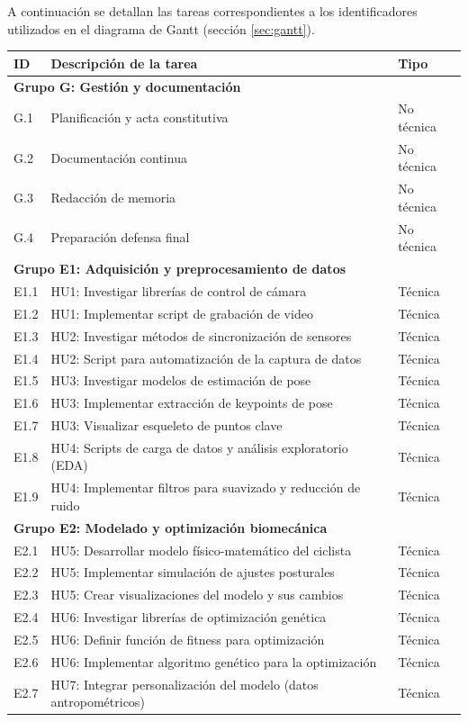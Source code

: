 \documentclass[
11pt, %
]{charter}
\begin{document}
A continuación se detallan las tareas correspondientes a los identificadores utilizados en el diagrama de Gantt (sección \ref{sec:gantt}).

\begin{longtable}{lp{10cm}l}
\toprule
\textbf{ID} & \textbf{Descripción de la tarea} & \textbf{Tipo} \\
\midrule
\endhead %

\multicolumn{3}{l}{\textbf{Grupo G: Gestión y documentación}} \\
G.1 & Planificación y acta constitutiva & No técnica \\
G.2 & Documentación continua & No técnica \\
G.3 & Redacción de memoria & No técnica \\
G.4 & Preparación defensa final & No técnica \\
\midrule

\multicolumn{3}{l}{\textbf{Grupo E1: Adquisición y preprocesamiento de datos}} \\
E1.1 & HU1: Investigar librerías de control de cámara & Técnica \\
E1.2 & HU1: Implementar script de grabación de video & Técnica \\
E1.3 & HU2: Investigar métodos de sincronización de sensores & Técnica \\
E1.4 & HU2: Script para automatización de la captura de datos & Técnica \\
E1.5 & HU3: Investigar modelos de estimación de pose & Técnica \\
E1.6 & HU3: Implementar extracción de keypoints de pose & Técnica \\
E1.7 & HU3: Visualizar esqueleto de puntos clave & Técnica \\
E1.8 & HU4: Scripts de carga de datos y análisis exploratorio (EDA) & Técnica \\
E1.9 & HU4: Implementar filtros para suavizado y reducción de ruido & Técnica \\
\midrule

\multicolumn{3}{l}{\textbf{Grupo E2: Modelado y optimización biomecánica}} \\
E2.1 & HU5: Desarrollar modelo físico-matemático del ciclista & Técnica \\
E2.2 & HU5: Implementar simulación de ajustes posturales & Técnica \\
E2.3 & HU5: Crear visualizaciones del modelo y sus cambios & Técnica \\
E2.4 & HU6: Investigar librerías de optimización genética & Técnica \\
E2.5 & HU6: Definir función de fitness para optimización & Técnica \\
E2.6 & HU6: Implementar algoritmo genético para la optimización & Técnica \\
E2.7 & HU7: Integrar personalización del modelo (datos antropométricos) & Técnica \\
\midrule


\end{longtable}
\end{document}
